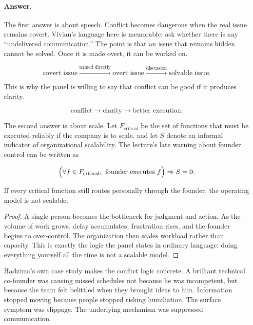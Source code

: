\paragraph{Answer.} The first answer is about speech. Conflict becomes dangerous when the real issue remains covert. Vivian's language here is memorable: ask whether there is any ``undelivered communication.'' The point is that an issue that remains hidden cannot be solved. Once it is made overt, it can be worked on.

\begin{equation}
\text{covert issue}
\xrightarrow{\text{named directly}}
\text{overt issue}
\xrightarrow{\text{discussion}}
\text{solvable issue}.
\end{equation}

This is why the panel is willing to say that conflict can be good if it produces clarity.

\begin{equation}
\text{conflict} \rightarrow \text{clarity} \rightarrow \text{better execution}.
\end{equation}

The second answer is about scale. Let \(F_{\mathrm{critical}}\) be the set of functions that must be executed reliably if the company is to scale, and let \(S\) denote an informal indicator of organizational scalability. The lecture's late warning about founder control can be written as

\begin{equation}
\Bigl(\forall f\in F_{\mathrm{critical}},\ \text{founder executes }f\Bigr)\Rightarrow S=0.
\end{equation}

\begin{proposition}
If every critical function still routes personally through the founder, the operating model is not scalable.
\end{proposition}

\begin{proof}
A single person becomes the bottleneck for judgment and action. As the volume of work grows, delay accumulates, frustration rises, and the founder begins to over-control. The organization then scales workload rather than capacity. This is exactly the logic the panel states in ordinary language: doing everything yourself all the time is not a scalable model.
\end{proof}

Hadzima's own case study makes the conflict logic concrete. A brilliant technical co-founder was causing missed schedules not because he was incompetent, but because the team felt belittled when they brought ideas to him. Information stopped moving because people stopped risking humiliation. The surface symptom was slippage. The underlying mechanism was suppressed communication.

